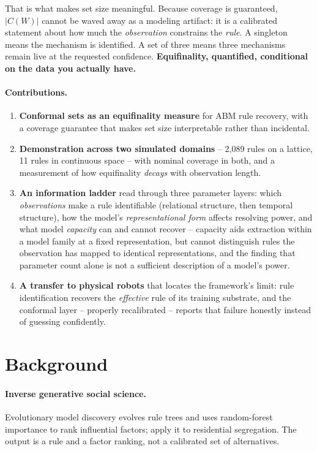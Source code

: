\documentclass[11pt]{article}
\begin{document}
That is what makes set size meaningful. Because coverage is guaranteed, $|C(W)|$
cannot be waved away as a modeling artifact: it is a calibrated statement about how
much the \emph{observation} constrains the \emph{rule}. A singleton means the
mechanism is identified. A set of three means three mechanisms remain live at the
requested confidence. \textbf{Equifinality, quantified, conditional on the data you
actually have.}

\paragraph{Contributions.}
\begin{enumerate}
\itemsep2pt
\item \textbf{Conformal sets as an equifinality measure} for ABM rule recovery, with
a coverage guarantee that makes set size interpretable rather than incidental.
\item \textbf{Demonstration across two simulated domains} -- 2,089 rules on a
lattice, 11 rules in continuous space -- with nominal coverage in both, and a
measurement of how equifinality \emph{decays} with observation length.
\item \textbf{An information ladder} read through three parameter layers: which
\emph{observations} make a rule identifiable (relational structure, then temporal
structure), how the model's \emph{representational form} affects resolving power, and
what model \emph{capacity} can and cannot recover -- capacity aids extraction within a
model family at a fixed representation, but cannot distinguish rules the observation
has mapped to identical representations, and the finding that parameter count alone is
not a sufficient description of a model's power.
\item \textbf{A transfer to physical robots} that locates the framework's limit:
rule identification recovers the \emph{effective} rule of its training substrate,
and the conformal layer -- properly recalibrated -- reports that failure honestly
instead of guessing confidently.
\end{enumerate}

\section{Background}

\paragraph{Inverse generative social science.}
Evolutionary model discovery \citep{gunaratne2020} evolves rule trees and uses
random-forest importance to rank influential factors; \citet{gunaratne2023} apply it
to residential segregation. The output is a rule and a factor ranking, not a
calibrated set of alternatives.
\end{document}
